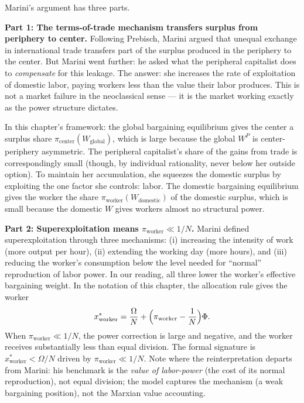 \documentclass[../structural_economics_book.tex]{subfiles}
\begin{document}
Marini's argument has three parts.

\textbf{Part 1: The terms-of-trade mechanism transfers surplus from periphery to center.} Following Prebisch, Marini argued that unequal exchange in international trade transfers part of the surplus produced in the periphery to the center. But Marini went further: he asked what the peripheral capitalist does to \textit{compensate} for this leakage. The answer: she increases the rate of exploitation of domestic labor, paying workers less than the value their labor produces. This is not a market failure in the neoclassical sense --- it is the market working exactly as the power structure dictates.

In this chapter's framework: the global bargaining equilibrium gives the center a surplus share $\pi_{\text{center}}(W_{\text{global}})$, which is large because the global $W^P$ is center-periphery asymmetric. The peripheral capitalist's share of the gains from trade is correspondingly small (though, by individual rationality, never below her outside option). To maintain her accumulation, she squeezes the domestic surplus by exploiting the one factor she controls: labor. The domestic bargaining equilibrium gives the worker the share $\pi_{\text{worker}}(W_{\text{domestic}})$ of the domestic surplus, which is small because the domestic $W$ gives workers almost no structural power.

\textbf{Part 2: Superexploitation means $\pi_{\text{worker}} \ll 1/N$.} Marini defined superexploitation through three mechanisms: (i) increasing the intensity of work (more output per hour), (ii) extending the working day (more hours), and (iii) reducing the worker's consumption below the level needed for ``normal'' reproduction of labor power. In our reading, all three lower the worker's effective bargaining weight. In the notation of this chapter, the allocation rule gives the worker
\begin{equation*}
x_{\text{worker}}^* = \frac{\Omega}{N} + \Bigl(\pi_{\text{worker}} - \frac{1}{N}\Bigr)\Phi .
\end{equation*}
When $\pi_{\text{worker}} \ll 1/N$, the power correction is large and negative, and the worker receives substantially less than equal division. The formal signature is $x_{\text{worker}}^* < \Omega/N$ driven by $\pi_{\text{worker}} \ll 1/N$. Note where the reinterpretation departs from Marini: his benchmark is the \textit{value of labor-power} (the cost of its normal reproduction), not equal division; the model captures the mechanism (a weak bargaining position), not the Marxian value accounting.
\end{document}
